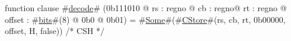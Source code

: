 function clause #\hyperref[zdecode]{decode}# (0b111010 @ rs : regno @ cb : regno@ rt : regno @ offset : #\hyperref[zbits]{bits}#(8) @ 0b0 @ 0b01) = #\hyperref[zSome]{Some}#(#\hyperref[zCStore]{CStore}#(rs, cb, rt, 0b00000, offset, H, false)) /* CSH */
